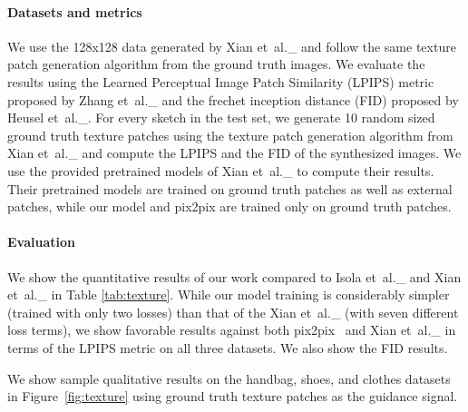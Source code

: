 \documentclass[10pt,twocolumn,letterpaper]{article}
\def\etal{et~al.\_}			  \def\eg{e.g.,~}               \def\ie{i.e.,~}               \def\etc{etc}                 \def\cf{cf.~}                 \def\viz{viz.~}               \def\vs{vs.~}
\newlength\paramargin
\newcommand{\figref}[1]{Figure~\ref{fig:#1}}
\begin{document}
\vspace{\paramargin}\paragraph{Datasets and metrics} We use the 128x128 data generated by Xian \etal\cite{xian2018texturegan} and follow the same texture patch generation algorithm from the ground truth images. We evaluate the results using the Learned Perceptual Image Patch Similarity (LPIPS) metric proposed by Zhang \etal\cite{zhang2018perceptual} and the frechet inception distance (FID) proposed by Heusel \etal\cite{heusel2017gans}. For every sketch in the test set, we generate 10 random sized ground truth texture patches using the texture patch generation algorithm from Xian \etal\cite{xian2018texturegan} and compute the LPIPS and the FID of the synthesized images. We use the provided pretrained models of Xian \etal\cite{xian2018texturegan} to compute their results. Their pretrained models are trained on ground truth patches as well as external patches, while our model and pix2pix are trained only on ground truth patches.

\vspace{\paramargin} \paragraph{Evaluation}
We show the quantitative results of our work compared to Isola \etal\cite{isola2017image} and Xian \etal\cite{xian2018texturegan} in Table \ref{tab:texture}. While our model training is considerably simpler (trained with only two losses) than that of the Xian \etal\cite{xian2018texturegan} (with seven different loss terms), we show favorable results against both  pix2pix~\cite{isola2017image} and Xian \etal\cite{xian2018texturegan} in terms of the LPIPS metric on all three datasets. We also show the FID results.


We show sample qualitative results on the handbag, shoes, and clothes datasets in \figref{texture} using ground truth texture patches as the guidance signal. 
\end{document}
